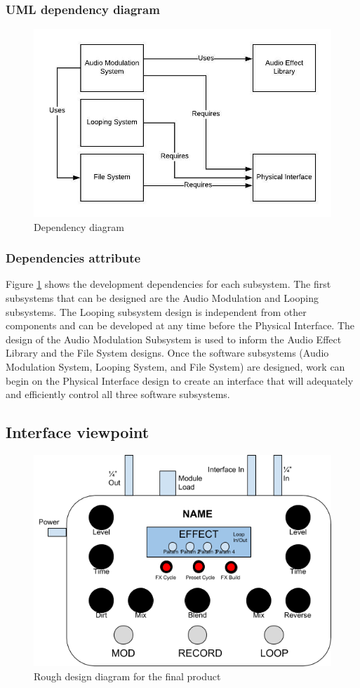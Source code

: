     \subsubsection{UML dependency diagram}
        \begin{figure}[!ht]
            \centering
            \includegraphics{diagrams/dependency-diagram.jpeg}
            \caption{Dependency diagram}
            \label{fig:dependency}
        \end{figure}
        
    \subsubsection{Dependencies attribute}
       Figure \ref{fig:dependency} shows the development dependencies for each subsystem. The first subsystems that can be designed are the Audio Modulation and Looping subsystems. The Looping subsystem design is independent from other components and can be developed at any time before the Physical Interface. The design of the Audio Modulation Subsystem is used to inform the Audio Effect Library and the File System designs. Once the software subsystems (Audio Modulation System, Looping System, and File System) are designed, work can begin on the Physical Interface design to create an interface that will adequately and efficiently control all three software subsystems.
        

\clearpage
\subsection{Interface viewpoint}
\begin{figure}[!ht]
    \centering
    \includegraphics[width=.5\textwidth]{diagrams/pedal-diagram.png}
    \caption{Rough design diagram for the final product}
    \label{fig:pedal diagram}
\end{figure}

